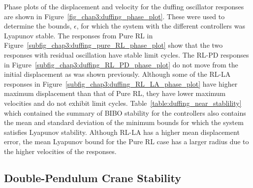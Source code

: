 Phase plots of the displacement and velocity for the duffing oscillator responses are shown in Figure~\ref{fig_chap3:duffing_phase_plot}. These were used to determine the bounds, $\epsilon$, for which the system with the different controllers was Lyapunov stable. The responses from Pure RL in Figure~\ref{subfig_chap3:duffing_pure_RL_phase_plot} show that the two responses with residual oscillation have stable limit cycles. The RL-PD responses in Figure~\ref{subfig_chap3:duffing_RL_PD_phase_plot} do not move from the initial displacement as was shown previously. Although some of the RL-LA responses in Figure~\ref{subfig_chap3:duffing_RL_LA_phase_plot} have higher maximum displacement than that of Pure RL, they have lower maximum velocities and do not exhibit limit cycles.
%
Table~\ref{table:duffing_near_stablility}
which contained the summary of BIBO stability for the controllers also
contains the mean and standard deviation of the minimum bounds for which the system satisfies Lyapunov stability.
Although RL-LA has a higher mean displacement error, the mean Lyapunov bound for the Pure RL case has a larger radius due to the higher velocities of the responses.

\subsection{Double-Pendulum Crane Stability}

